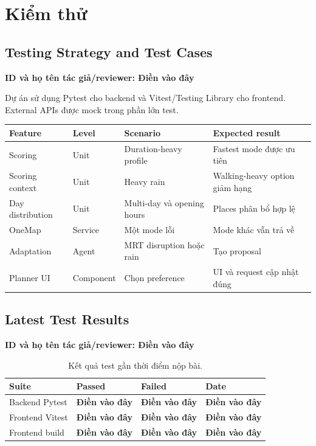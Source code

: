 \documentclass[12pt,a4paper]{article}
\newcommand{\dienvao}{\textbf{Điền vào đây}}
\newcommand{\tacgia}{%
  \begin{tcolorbox}[colback=blue!3,colframe=blue!25,boxrule=0.4pt,arc=1mm]
    \small\textbf{ID và họ tên tác giả/reviewer: Điền vào đây}
  \end{tcolorbox}
}
\begin{document}
\section{Kiểm thử}

\subsection{Testing Strategy and Test Cases}
\tacgia

Dự án sử dụng Pytest cho backend và Vitest/Testing Library cho frontend. External APIs được mock trong phần lớn test.

\begin{longtable}{|L{2.8cm}|L{2.5cm}|L{5.0cm}|L{4.0cm}|}
\hline
\textbf{Feature} & \textbf{Level} & \textbf{Scenario} & \textbf{Expected result} \\ \hline
\endhead
Scoring & Unit & Duration-heavy profile & Fastest mode được ưu tiên \\ \hline
Scoring context & Unit & Heavy rain & Walking-heavy option giảm hạng \\ \hline
Day distribution & Unit & Multi-day và opening hours & Places phân bổ hợp lệ \\ \hline
OneMap & Service & Một mode lỗi & Mode khác vẫn trả về \\ \hline
Adaptation & Agent & MRT disruption hoặc rain & Tạo proposal \\ \hline
Planner UI & Component & Chọn preference & UI và request cập nhật đúng \\ \hline
\end{longtable}

\subsection{Latest Test Results}
\tacgia

\begin{table}[H]
\centering
\begin{tabular}{|C{4cm}|C{2.5cm}|C{2.5cm}|C{3cm}|}
\hline
\textbf{Suite} & \textbf{Passed} & \textbf{Failed} & \textbf{Date} \\ \hline
Backend Pytest & \dienvao & \dienvao & \dienvao \\ \hline
Frontend Vitest & \dienvao & \dienvao & \dienvao \\ \hline
Frontend build & \dienvao & \dienvao & \dienvao \\ \hline
\end{tabular}
\caption{Kết quả test gần thời điểm nộp bài.}
\end{table}
\end{document}
